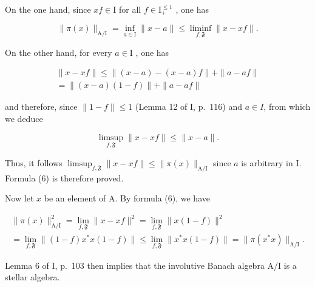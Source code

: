 On the one hand, since \(xf \in \mathrm{I}\) for all \(f \in \mathrm{I}_{+}^{\leqslant 1}\) , one has

\[
\| \pi (x) \| _ {\mathrm{A} / \mathrm{I}} = \inf _ {a \in \mathrm{I}} \| x - a \| \leqslant \operatorname * {l i m i n f} _ {f, \mathfrak {F}} \| x - x f \|.
\]

On the other hand, for every \(a \in \mathrm{I}\) , one has

\[
\begin{array}{c} \| x - x f \| \leqslant \| (x - a) - (x - a) f \| + \| a - a f \| \\ = \| (x - a) (1 - f) \| + \| a - a f \| \end{array}
\]

and therefore, since \(\|1 - f\| \leqslant 1\) (Lemma 12 of I, p.~116) and \(a \in I\), from which we deduce

\[
\operatorname * {l i m s u p} _ {f, \mathfrak {F}} \| x - x f \| \leqslant \| x - a \|.
\]

Thus, it follows \(\limsup_{f,\mathfrak{F}} \|x - xf\| \leqslant \|\pi(x)\|_{\mathrm{A/I}}\) since \(a\) is arbitrary in I. Formula (6) is therefore proved.

Now let \(x\) be an element of A. By formula (6), we have

\[
\begin{array}{c} \| \pi (x) \| _ {\mathrm{A/I}} ^ {2} = \lim _ {f, \mathfrak {F}} \| x - x f \| ^ {2} = \lim _ {f, \mathfrak {F}} \| x (1 - f) \| ^ {2} \\ = \lim _ {f, \mathfrak {F}} \| (1 - f) x ^ {*} x (1 - f) \| \leqslant \lim _ {f, \mathfrak {F}} \| x ^ {*} x (1 - f) \| = \| \pi (x ^ {*} x) \| _ {\mathrm{A/I}}. \end{array}
\]

Lemma 6 of I, p.~103 then implies that the involutive Banach algebra A/I is a stellar algebra.

